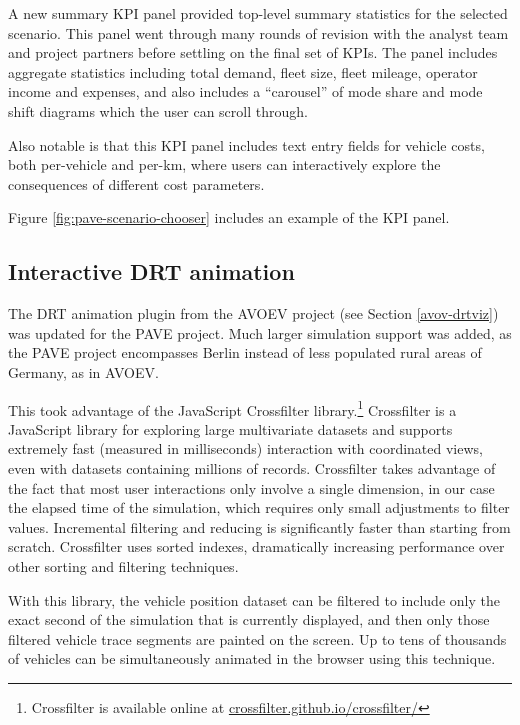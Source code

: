 A new summary \gls{KPI} panel provided top-level summary statistics for the selected scenario. This panel went through many rounds of revision with the analyst team and project partners before settling on the final set of KPIs. The panel includes aggregate statistics including total demand, fleet size, fleet mileage, operator income and expenses, and also includes a ``carousel'' of mode share and mode shift diagrams which the user can scroll through.

Also notable is that this KPI panel includes text entry fields for vehicle costs, both per-vehicle and per-km, where users can interactively explore the consequences of different cost parameters.

Figure \ref{fig:pave-scenario-chooser} includes an example of the KPI panel.

\subsection{Interactive DRT animation}
\label{pave-drt-animation}

The DRT animation plugin from the AVOEV project (see Section \ref{avov-drtviz}) was updated for the PAVE project. Much larger simulation support was added, as the PAVE project encompasses Berlin instead of less populated rural areas of Germany, as in AVOEV.

This took advantage of the JavaScript Crossfilter library.\footnote{Crossfilter is available online at \href{https://crossfilter.github.io/crossfilter/}{crossfilter.github.io/crossfilter/}} Crossfilter is a JavaScript library for exploring large multivariate datasets and supports extremely fast (measured in milliseconds) interaction with coordinated views, even with datasets containing millions of records. Crossfilter takes advantage of the fact that most user interactions only involve a single dimension, in our case the elapsed time of the simulation, which requires only small adjustments to filter values. Incremental filtering and reducing is significantly faster than starting from scratch. Crossfilter uses sorted indexes, dramatically increasing perfor­mance over other sorting and filtering techniques.

With this library, the vehicle position dataset can be filtered to include only the exact second of the simulation that is currently displayed, and then only those filtered vehicle trace segments are painted on the screen. Up to tens of thousands of vehicles can be simultaneously animated in the browser using this technique.

